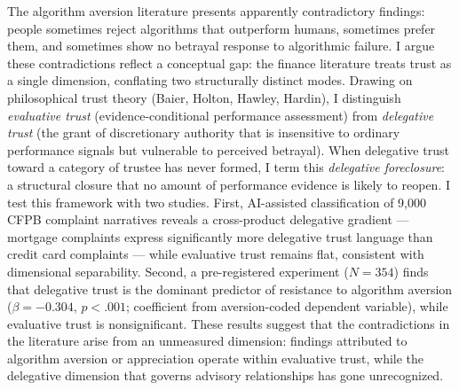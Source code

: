 The algorithm aversion literature presents apparently contradictory findings: people sometimes reject algorithms that outperform humans, sometimes prefer them, and sometimes show no betrayal response to algorithmic failure. I argue these contradictions reflect a conceptual gap: the finance literature treats trust as a single dimension, conflating two structurally distinct modes. Drawing on philosophical trust theory (Baier, Holton, Hawley, Hardin), I distinguish \textit{evaluative trust} (evidence-conditional performance assessment) from \textit{delegative trust} (the grant of discretionary authority that is insensitive to ordinary performance signals but vulnerable to perceived betrayal). When delegative trust toward a category of trustee has never formed, I term this \textit{delegative foreclosure}: a structural closure that no amount of performance evidence is likely to reopen. I test this framework with two studies. First, AI-assisted classification of 9,000 CFPB complaint narratives reveals a cross-product delegative gradient --- mortgage complaints express significantly more delegative trust language than credit card complaints --- while evaluative trust remains flat, consistent with dimensional separability. Second, a pre-registered experiment ($N = 354$) finds that delegative trust is the dominant predictor of resistance to algorithm aversion ($\beta = -0.304$, $p < .001$; coefficient from aversion-coded dependent variable), while evaluative trust is nonsignificant. These results suggest that the contradictions in the literature arise from an unmeasured dimension: findings attributed to algorithm aversion or appreciation operate within evaluative trust, while the delegative dimension that governs advisory relationships has gone unrecognized.
